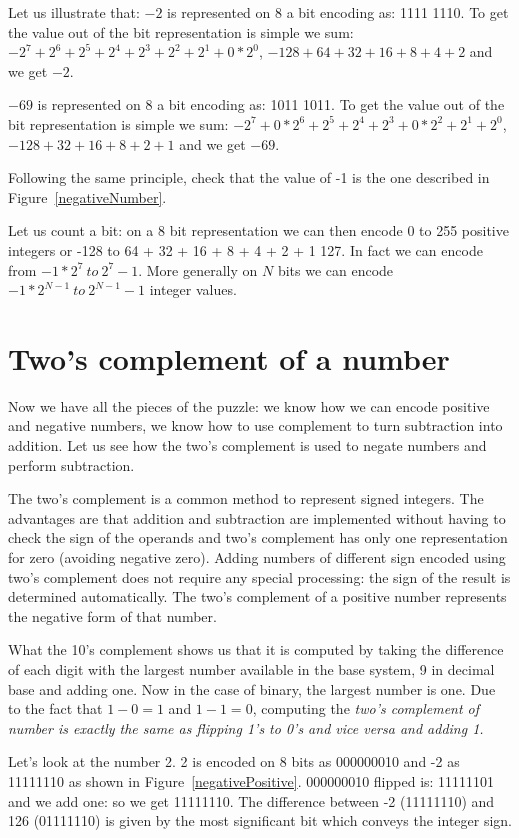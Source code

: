 \documentclass[a4paper,10pt,twoside]{book}
\begin{document}
Let us illustrate that: 
$-2$  is represented on 8 a bit encoding as: 1111 1110.  To get the value out of the bit representation is simple we sum: $-2^7 + 2^6 + 2^5 + 2^4 + 2^3 + 2^2 + 2^1 + 0*2^0$, \ie $-128 + 64 + 32 + 16 + 8 + 4 + 2$ and we get $-2$. 

$-69$ is represented on 8 a bit encoding as: 1011 1011. To get the value out of the bit representation is simple we sum: $-2^7 + 0*2^6 + 2^5 + 2^4 + 2^3 + 0*2^2 + 2^1 + 2^0$, \ie $-128 + 32 + 16 + 8 + 2 + 1$ and we get $-69$. 

Following the same principle, check that the value of -1 is the one described in Figure~\ref{negativeNumber}.

Let us count a bit: on a 8 bit representation we can then encode 0 to 255 positive integers or -128 to 64 + 32 + 16 + 8 + 4 + 2 + 1 
127. In fact we can encode from $-1 * 2^{7}\ to\ 2^{7}-1$. More generally on $N$ bits we can encode $-1 * 2^{N-1}\ to\ 2^{N-1}-1$ integer values.




\section{Two's complement of a number}
Now we have all the pieces of the puzzle: we know how we can encode positive and negative numbers, we know how to use complement to turn subtraction into addition. Let us see how the two's complement is used to negate numbers and perform subtraction.

The two's complement is a common method to represent signed integers. The advantages are that addition and subtraction are implemented without having to  check the sign of the operands and two's complement has only one representation for zero (avoiding negative zero). Adding numbers of different sign encoded using two's complement does not  require any special processing: the sign of the result is determined automatically. The two's complement of a positive number represents the negative form of that number.

What the 10's complement shows us that it is computed by taking the difference of each digit with the largest number available in the base system, 9 in decimal base and adding one. Now in the case of binary, the largest number is one.
Due to the fact that $1 - 0 = 1$ and $1 - 1 = 0$, computing the \emph{two's complement of number is exactly the same as flipping 1's to 0's and vice versa and adding 1.}


Let's look at the number 2. 2 is encoded on 8 bits as 000000010 and -2 as 11111110 as shown in Figure~\ref{negativePositive}.
000000010 flipped is: 11111101 and we add one: so we get 11111110. The difference between  -2 (11111110) and 126 (01111110) is given by the most significant bit which conveys the integer sign.
\end{document}

